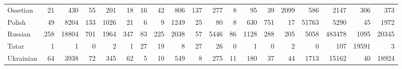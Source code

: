 \begin{landscape}
\begin{table}[t]
\begin{tabular}{lrrrrrrrrrrrrrrrrrr}
Ossetian & 21 & 430 & 55 & 201 & 18 & 16 & 42 & 806 & 137 & 277 & 8 & 95 & 39 & 2099 & 586 & 2147 & 306 & 373\\
Polish & 49 & 8204 & 133 & 1026 & 21 & 6 & 9 & 1249 & 25 & 80 & 8 & 630 & 751 & 17 & 51763 & 5290 & 45 & 1972\\
Russian & 258 & 18804 & 701 & 1964 & 347 & 83 & 225 & 2038 & 57 & 5446 & 86 & 1128 & 288 & 205 & 5058 & 483478 & 1095 & 20345\\
Tatar & 1 & 1 & 0 & 2 & 1 & 27 & 19 & 8 & 27 & 26 & 0 & 1 & 0 & 2 & 0 & 107 & 19591 & 3\\
Ukrainian & 64 & 3938 & 72 & 345 & 62 & 5 & 10 & 549 & 8 & 275 & 11 & 180 & 37 & 44 & 1713 & 15162 & 40 & 18924\\
\bottomrule
\end{tabular}
\end{table}
\end{landscape}
